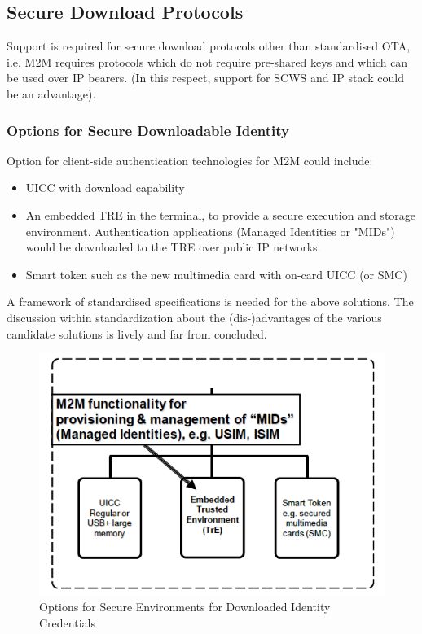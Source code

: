 \documentclass[12pt]{article}
\begin{document}
\subsection{Secure Download Protocols}
Support is required for secure download protocols other than standardised OTA, i.e. M2M requires protocols which do not require pre-shared keys and which can be used over IP bearers. (In this respect, support for SCWS and IP stack could be an advantage).


\subsubsection{Options for Secure Downloadable Identity} 
Option for client-side authentication technologies for M2M could include:
\begin{itemize}
\item UICC with download capability
\item An embedded TRE in the terminal, to provide a secure execution and storage
environment. Authentication applications (Managed Identities or "MIDs")
would be downloaded to the TRE over public IP networks.
\item Smart token such as the new multimedia card with on-card UICC (or SMC)

\end{itemize}

A framework of standardised specifications is needed for the above solutions. The discussion within standardization about the (dis-)advantages of the various candidate solutions is lively and far from concluded.

\begin{figure}[!t]
\centering
    \includegraphics[scale=0.8]{tre}
    \caption{Options for Secure Environments for Downloaded Identity Credentials}
    \label{tre}
\label{adhoc}

\end{figure}
\end{document}
